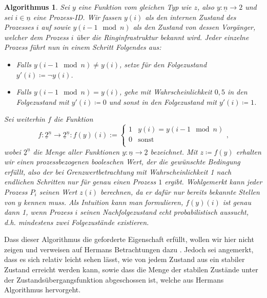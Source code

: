 \documentclass[a4paper]{article}
\newtheorem{algorithmus}[satz]{Algorithmus}
\theoremstyle{nonumberplain}
\begin{document}
	\begin{algorithmus}\label{alg-herman}
		Sei $y$ eine Funktion vom gleichen Typ wie $z$, also $y : \underline{n} \to 2$ und sei $i \in \underline{n}$ eine Prozess-ID. Wir fassen $y(i)$ als den internen Zustand des Prozesses $i$ auf sowie $y(i - 1 \mod n)$ als den Zustand von dessen Vorgänger, welcher dem Prozess $i$ über die Ringinfrastruktur bekannt wird. Jeder einzelne Prozess führt nun in einem Schritt Folgendes aus:
		\begin{itemize}
			\item Falls $y(i-1 \mod n) \neq y(i)$, setze für den Folgezustand $y'(i) \coloneqq \neg y(i)$.
			\item Falls $y(i-1 \mod n) =    y(i)$, gehe mit Wahrscheinlichkeit $0,5$ in den Folgezustand mit $y'(i) \coloneqq 0$ und sonst in den Folgezustand mit $y'(i) \coloneqq 1$.
		\end{itemize}
		Sei weiterhin $f$ die Funktion
		\begin{equation}
		f : \underline{2}^{\underline{n}} \to \underline{2}^{\underline{n}} : f(y)(i) :=  \begin{cases}
		1 & y(i) = y(i-1 \mod n)\\
		0 & \text{sonst}\\
		\end{cases}\text{,}
		\end{equation}
		wobei $\underline{2}^{\underline{n}}$ die Menge aller Funktionen $y : \underline{n}\to\underline{2}$ bezeichnet.
		Mit $z \coloneqq f(y)$ erhalten wir einen prozessbezogenen booleschen Wert, der die gewünschte Bedingung erfüllt, also der bei Grenzwertbetrachtung mit Wahrscheinlichkeit 1 nach endlichen Schritten nur für genau einen Prozess $1$ ergibt. Wohlgemerkt kann jeder Prozess $P_i$ seinen Wert $z(i)$ berechnen, da er dafür nur bereits bekannte Stellen von $y$ kennen muss. Als Intuition kann man formulieren, $f(y)(i)$ ist genau dann 1, wenn Prozess $i$ seinen Nachfolgezustand echt probabilistisch aussucht, d.h. mindestens zwei Folgezustände existieren.
	\end{algorithmus}
	
	Dass dieser Algorithmus die geforderte Eigenschaft erfüllt, wollen wir hier nicht zeigen und verweisen auf Hermans Betrachtungen dazu \cite{Her90}. Jedoch sei angemerkt, dass es sich relativ leicht sehen lässt, wie von jedem Zustand aus ein stabiler Zustand erreicht werden kann, sowie dass die Menge der stabilen Zustände unter der Zustandsübergangsfunktion abgeschossen ist, welche aus Hermans Algorithmus hervorgeht.
	
\end{document}
